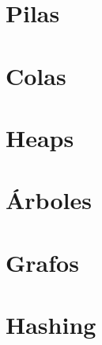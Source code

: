 \documentclass[titlepage,oneside]{book}
\begin{document}
\chapter{Pilas}

\chapter{Colas}

\chapter{Heaps}

\chapter{Árboles}

\chapter{Grafos}

\chapter{Hashing}

\printbibliography{}
\end{document}
